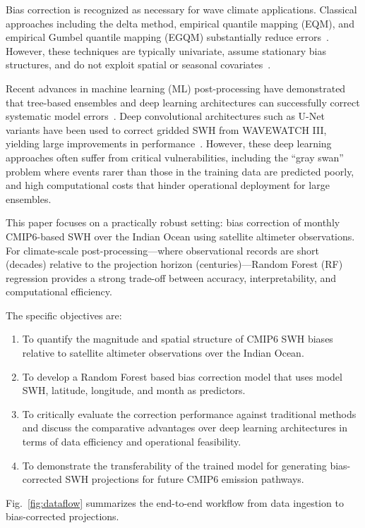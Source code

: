 \documentclass[conference]{IEEEtran}
\begin{document}
Bias correction is recognized as necessary for wave climate applications. Classical approaches including the delta method, empirical quantile mapping (EQM), and empirical Gumbel quantile mapping (EGQM) substantially reduce errors~\cite{lemos2020}. However, these techniques are typically univariate, assume stationary bias structures, and do not exploit spatial or seasonal covariates~\cite{cannon2018}.

Recent advances in machine learning (ML) post-processing have demonstrated that tree-based ensembles and deep learning architectures can successfully correct systematic model errors~\cite{reichstein2019}. Deep convolutional architectures such as U-Net variants have been used to correct gridded SWH from WAVEWATCH III, yielding large improvements in performance~\cite{sun2022}. However, these deep learning approaches often suffer from critical vulnerabilities, including the ``gray swan'' problem where events rarer than those in the training data are predicted poorly, and high computational costs that hinder operational deployment for large ensembles.

This paper focuses on a practically robust setting: bias correction of monthly CMIP6-based SWH over the Indian Ocean using satellite altimeter observations. For climate-scale post-processing---where observational records are short (decades) relative to the projection horizon (centuries)---Random Forest (RF) regression provides a strong trade-off between accuracy, interpretability, and computational efficiency.

The specific objectives are:
\begin{enumerate}
    \item To quantify the magnitude and spatial structure of CMIP6 SWH biases relative to satellite altimeter observations over the Indian Ocean.
    \item To develop a Random Forest based bias correction model that uses model SWH, latitude, longitude, and month as predictors.
    \item To critically evaluate the correction performance against traditional methods and discuss the comparative advantages over deep learning architectures in terms of data efficiency and operational feasibility.
    \item To demonstrate the transferability of the trained model for generating bias-corrected SWH projections for future CMIP6 emission pathways.
\end{enumerate}

Fig.~\ref{fig:dataflow} summarizes the end-to-end workflow from data ingestion to bias-corrected projections.
\end{document}
